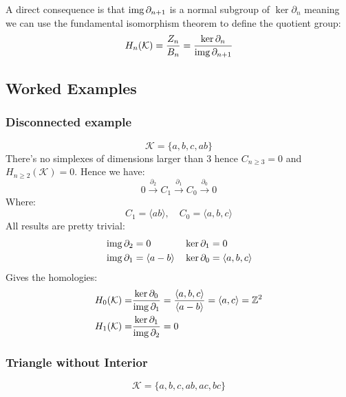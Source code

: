 A direct consequence is that $\operatorname{img}\partial_{n+1}$ is a normal subgroup of $\ker\partial_n$ meaning we can use the fundamental isomorphism theorem to define the quotient group:
\[H_n(\mathcal{K}) = \frac{Z_n}{B_n} = \frac{\ker\partial_n}{\operatorname{img}\partial_{n+1}}\]

\subsection{Worked Examples}
\subsubsection{Disconnected example}
\begin{center}
\end{center}
\[\mathcal{K}=\{a,b,c,ab\}\]
There's no simplexes of dimensions larger than $3$ hence $C_{n\geq 3} = 0$ and $H_{n\geq 2}(\mathcal{K}) = 0$.
Hence we have:
\[0 \stackrel{\partial_2}{\longrightarrow} C_1 \stackrel{\partial_1}{\longrightarrow} C_0 \stackrel{\partial_0}{\longrightarrow} 0\]
Where:
\[C_1 = \langle ab \rangle,\quad C_0 = \langle a,b,c \rangle\]
All results are pretty trivial:
\begin{equation*}
\begin{aligned}
	&\operatorname{img} \partial_2 = 0 && \ker \partial_1 = 0\\
	&\operatorname{img} \partial_1 = \langle a-b\rangle && \ker \partial_0 = \langle a,b,c\rangle\\
\end{aligned}
\end{equation*}
Gives the homologies:
\begin{equation*}
\begin{aligned}
	H_0(\mathcal{K}) =& \frac{\ker\partial_0}{\operatorname{img}\partial_1} = \frac{\langle a,b,c\rangle}{\langle a-b\rangle} = \langle a,c\rangle = \mathbb{Z}^2\\
	H_1(\mathcal{K}) =& \frac{\ker\partial_1}{\operatorname{img}\partial_2} = 0 \\
\end{aligned}
\end{equation*}


\subsubsection{Triangle without Interior}
\begin{center}
\end{center}
\[\mathcal{K}=\{a,b,c,ab,ac,bc\}\]

